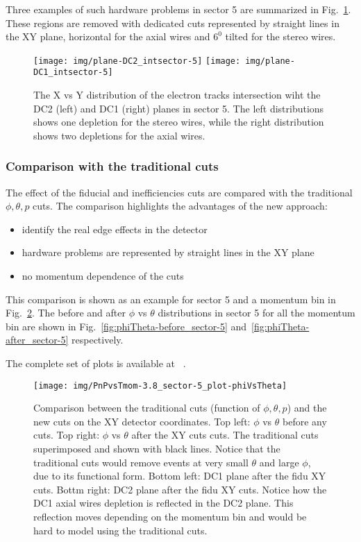Three examples of such hardware problems in sector 5 are summarized in Fig.~\ref{fig:xy_dc12_s5}.
These regions are removed with dedicated cuts represented by straight lines in the XY plane,
horizontal for the axial wires and $6^0$ tilted for the stereo wires.


\begin{figure}[ht]
    \centering
    \texttt{[image: img/plane-DC2\_intsector-5]}
    \texttt{[image: img/plane-DC1\_intsector-5]}
    \caption{The X vs Y distribution of the electron tracks intersection wiht the DC2 (left)
        and DC1 (right) planes in sector 5. The left distributions shows one depletion for the stereo wires,
        while the right distribution shows two depletions for the axial wires.}
    \label{fig:xy_dc12_s5}
\end{figure}

\subsubsection{Comparison with the traditional cuts}

The effect of the fiducial and inefficiencies cuts are compared with the traditional $\phi, \theta, p$ cuts.
The comparison highlights the advantages of the new approach:

\begin{itemize}
    \item identify the real edge effects in the detector
    \item hardware problems are represented by straight lines in the XY plane
    \item no momentum dependence of the cuts
\end{itemize}
This comparison is shown as an example for sector 5 and a momentum bin in Fig.~\ref{fig:PnPvsTmom-3.8_sector-5_plot-phiVsTheta}.
The before and after $\phi$ vs $\theta$ distributions in sector 5 for all the momentum bin are shown in Fig.~\ref{fig:phiTheta-before_sector-5}
and~\ref{fig:phiTheta-after_sector-5} respectively.

The complete set of plots is available at ~\cite{bib:pi0_resonance_fiducial_electron}.

\begin{figure}[ht]
    \centering
    \texttt{[image: img/PnPvsTmom-3.8\_sector-5\_plot-phiVsTheta]}
    \caption{Comparison between the traditional cuts (function of $\phi, \theta, p$) and the new cuts on the XY detector coordinates.
    Top left:  $\phi$ vs $\theta$ before any cuts. Top right:  $\phi$ vs $\theta$ after the XY cuts cuts. The traditional cuts superimposed
    and shown with black lines. Notice that the traditional cuts would remove events at very small $\theta$ and large $\phi$, due to its functional form.
    Bottom left: DC1 plane after the fidu XY cuts. Bottm right: DC2 plane after the fidu XY cuts.
    Notice how the DC1 axial wires depletion is reflected in the DC2 plane. This reflection moves depending on the momentum bin and would be hard to model
    using the traditional cuts.}
    \label{fig:PnPvsTmom-3.8_sector-5_plot-phiVsTheta}
\end{figure}


